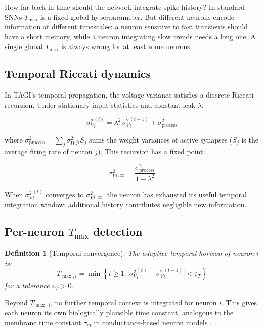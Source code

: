 \documentclass[12pt, a4paper]{article}
\newtheorem{definition}{Definition}[section]
\newcommand{\sW}{\sigma^{2}_{W}}
\newcommand{\sV}{\sigma^{2}_{V}}
\begin{document}
How far back in time should the network integrate spike history? In standard SNNs
$T_{\max}$ is a fixed global hyperparameter. But different neurons encode information at
different timescales: a neuron sensitive to fast transients should have a short memory,
while a neuron integrating slow trends needs a long one. A single global $T_{\max}$ is
always wrong for at least some neurons.

\subsection{Temporal Riccati dynamics}

In TAGI's temporal propagation, the voltage variance satisfies a discrete Riccati
recursion. Under stationary input statistics and constant leak $\lambda$:

\begin{equation}
    \sV_i^{(t)} = \lambda^2\, \sV_i^{(t-1)} + \sigma^2_{\text{process}}
    \label{eq:riccati}
\end{equation}

where $\sigma^2_{\text{process}} = \sum_j \sW_{ji} \bar{S}_j$ sums the weight variances
of active synapses ($\bar{S}_j$ is the average firing rate of neuron $j$). This
recursion has a fixed point:

\begin{equation}
    \sV_{i,\infty} = \frac{\sigma^2_{\text{process}}}{1 - \lambda^2}
    \label{eq:fixed_point}
\end{equation}

When $\sV_i^{(t)}$ converges to $\sV_{i,\infty}$, the neuron has exhausted its useful
temporal integration window: additional history contributes negligible new information.

\subsection{Per-neuron $T_{\max}$ detection}

\begin{definition}[Temporal convergence]
The \emph{adaptive temporal horizon} of neuron $i$ is:
\begin{equation}
    T_{\max,i} = \min\!\left\{t \geq 1 : \left|\sV_i^{(t)} - \sV_i^{(t-1)}\right| < \varepsilon_T \right\}
    \label{eq:tmax}
\end{equation}
for a tolerance $\varepsilon_T > 0$.
\end{definition}

Beyond $T_{\max,i}$, no further temporal context is integrated for neuron $i$. This
gives each neuron its own biologically plausible time constant, analogous to the
membrane time constant $\tau_m$ in conductance-based neuron models \citep{dayan2001theoretical}.
\end{document}
